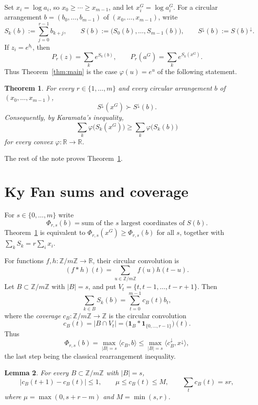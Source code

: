 \documentclass[11pt]{article}
\newtheorem{theorem}{Theorem}[section]
\newtheorem{lemma}[theorem]{Lemma}
\theoremstyle{definition}
\newcommand{\Z}{\mathbb{Z}}
\newcommand{\R}{\mathbb{R}}
\newcommand{\ind}{\mathbf{1}}
\begin{document}
Set $x_i=\log a_i$, so $x_0\ge\cdots\ge x_{m-1}$, and let $x^G_i=\log a^G_i$. For a circular arrangement $b=(b_0,\dots,b_{m-1})$ of $(x_0,\dots,x_{m-1})$, write
\[
S_k(b):=\sum_{j=0}^{r-1}b_{k+j},\qquad
S(b):=\bigl(S_0(b),\dots,S_{m-1}(b)\bigr),
\qquad
S^\downarrow(b):=S(b)^\downarrow.
\]
If $z_i=e^{b_i}$, then
\[
P_r(z)=\sum_k e^{S_k(b)},
\qquad
P_r(a^G)=\sum_k e^{S_k(x^G)}.
\]
Thus Theorem~\ref{thm:main} is the case $\varphi(u)=e^u$ of the following statement.

\begin{theorem}\label{thm:A}
For every $r\in\{1,\dots,m\}$ and every circular arrangement $b$ of $(x_0,\dots,x_{m-1})$,
\[
S^\downarrow(x^G)\succ S^\downarrow(b).
\]
Consequently, by Karamata's inequality,
\[
\sum_k\varphi\bigl(S_k(x^G)\bigr)
\ge
\sum_k\varphi\bigl(S_k(b)\bigr)
\]
for every convex $\varphi:\R\to\R$.
\end{theorem}

The rest of the note proves Theorem~\ref{thm:A}.

\section{Ky Fan sums and coverage}

For $s\in\{0,\dots,m\}$ write
\[
\Phi_{r,s}(b)=\text{sum of the $s$ largest coordinates of $S(b)$}.
\]
Theorem~\ref{thm:A} is equivalent to $\Phi_{r,s}(x^G)\ge\Phi_{r,s}(b)$ for all $s$, together with $\sum_kS_k=r\sum_ix_i$.

For functions $f,h:\Z/m\Z\to\R$, their circular convolution is
\[
(f*h)(t)=\sum_{u\in\Z/m\Z}f(u)h(t-u).
\]
Let $B\subset\Z/m\Z$ with $|B|=s$, and put $V_t=\{t,t-1,\dots,t-r+1\}$. Then
\[
\sum_{k\in B}S_k(b)=\sum_{t=0}^{m-1}c_B(t)b_t,
\]
where the \emph{coverage} $c_B:\Z/m\Z\to\Z$ is the circular convolution
\begin{equation}\label{eq:coverage}
 c_B(t)=|B\cap V_t|
 =\bigl(\ind_B*\ind_{\{0,\dots,r-1\}}\bigr)(t).
\end{equation}
Thus
\begin{equation}\label{eq:Phi}
\Phi_{r,s}(b)
=\max_{|B|=s}\langle c_B,b\rangle
\le\max_{|B|=s}\langle c_B^\downarrow,x^\downarrow\rangle,
\end{equation}
the last step being the classical rearrangement inequality.

\begin{lemma}\label{lem:lip}
For every $B\subset\Z/m\Z$ with $|B|=s$,
\[
|c_B(t+1)-c_B(t)|\le1,
\qquad
\mu\le c_B(t)\le M,
\qquad
\sum_tc_B(t)=sr,
\]
where $\mu=\max(0,s+r-m)$ and $M=\min(s,r)$.
\end{lemma}
\end{document}
